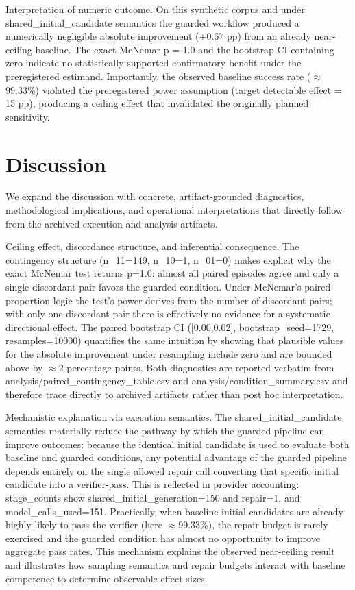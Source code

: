 \documentclass[conference]{IEEEtran}
\begin{document}
Interpretation of numeric outcome. On this synthetic corpus and under shared\_initial\_candidate semantics the guarded workflow produced a numerically negligible absolute improvement (+0.67 pp) from an already near-ceiling baseline. The exact McNemar p = 1.0 and the bootstrap CI containing zero indicate no statistically supported confirmatory benefit under the preregistered estimand. Importantly, the observed baseline success rate (\ensuremath{\approx}99.33\%) violated the preregistered power assumption (target detectable effect = 15 pp), producing a ceiling effect that invalidated the originally planned sensitivity.

\section{Discussion}
We expand the discussion with concrete, artifact-grounded diagnostics, methodological implications, and operational interpretations that directly follow from the archived execution and analysis artifacts.

Ceiling effect, discordance structure, and inferential consequence. The contingency structure (n\_11=149, n\_10=1, n\_01=0) makes explicit why the exact McNemar test returns p=1.0: almost all paired episodes agree and only a single discordant pair favors the guarded condition. Under McNemar's paired-proportion logic the test's power derives from the number of discordant pairs; with only one discordant pair there is effectively no evidence for a systematic directional effect. The paired bootstrap CI ([0.00,0.02], bootstrap\_seed=1729, resamples=10000) quantifies the same intuition by showing that plausible values for the absolute improvement under resampling include zero and are bounded above by \ensuremath{\approx}2 percentage points. Both diagnostics are reported verbatim from analysis/paired\_contingency\_table.csv and analysis/condition\_summary.csv and therefore trace directly to archived artifacts rather than post hoc interpretation.

Mechanistic explanation via execution semantics. The shared\_initial\_candidate semantics materially reduce the pathway by which the guarded pipeline can improve outcomes: because the identical initial candidate is used to evaluate both baseline and guarded conditions, any potential advantage of the guarded pipeline depends entirely on the single allowed repair call converting that specific initial candidate into a verifier-pass. This is reflected in provider accounting: stage\_counts show shared\_initial\_generation=150 and repair=1, and model\_calls\_used=151. Practically, when baseline initial candidates are already highly likely to pass the verifier (here \ensuremath{\approx}99.33\%), the repair budget is rarely exercised and the guarded condition has almost no opportunity to improve aggregate pass rates. This mechanism explains the observed near-ceiling result and illustrates how sampling semantics and repair budgets interact with baseline competence to determine observable effect sizes.
\end{document}
